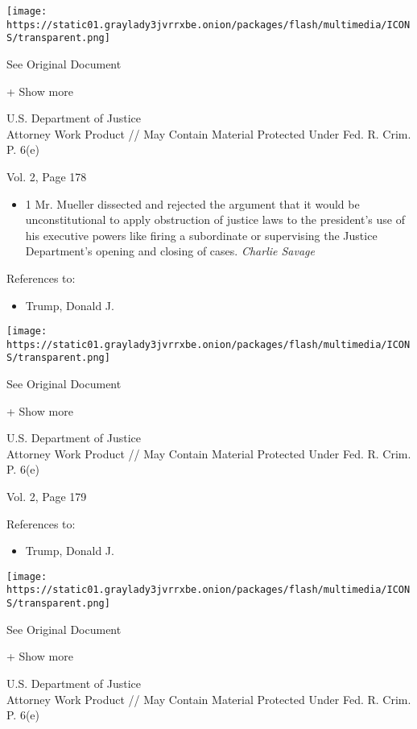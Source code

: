 \texttt{[image: https://static01.graylady3jvrrxbe.onion/packages/flash/multimedia/ICONS/transparent.png]}

See Original Document

+ Show more

U.S. Department of Justice\\
Attorney Work Product // May Contain Material Protected Under Fed. R.
Crim. P. 6(e)

Vol. 2, Page 178

\begin{itemize}
\tightlist
\item
  1 Mr. Mueller dissected and rejected the argument that it would be
  unconstitutional to apply obstruction of justice laws to the
  president's use of his executive powers like firing a subordinate or
  supervising the Justice Department's opening and closing of cases.
  \emph{Charlie Savage}
\end{itemize}

References to:

\begin{itemize}
\tightlist
\item
  Trump, Donald J.
\end{itemize}

\protect\hyperlink{}{}

\texttt{[image: https://static01.graylady3jvrrxbe.onion/packages/flash/multimedia/ICONS/transparent.png]}

See Original Document

+ Show more

U.S. Department of Justice\\
Attorney Work Product // May Contain Material Protected Under Fed. R.
Crim. P. 6(e)

Vol. 2, Page 179

References to:

\begin{itemize}
\tightlist
\item
  Trump, Donald J.
\end{itemize}

\protect\hyperlink{}{}

\texttt{[image: https://static01.graylady3jvrrxbe.onion/packages/flash/multimedia/ICONS/transparent.png]}

See Original Document

+ Show more

U.S. Department of Justice\\
Attorney Work Product // May Contain Material Protected Under Fed. R.
Crim. P. 6(e)

